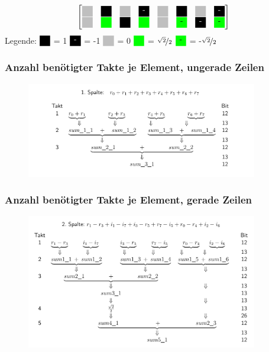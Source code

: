 \begin{frame}
\begin{center}
\begin{minipage}{0.9\textwidth}
\begin{center}
\[{\begin{bmatrix}
     \myboxZero 	& \myboxOnePos 		& \myboxZero 	& \myboxOneNeg 		& \myboxZero 	& \myboxOnePos 		& \myboxZero 	& \myboxOneNeg \\
     \myboxZero 	& \myboxSqrtPos 	& \myboxOnePos 	& \myboxSqrtPos		& \myboxZero	& \myboxSqrtNeg		& \myboxOneNeg	& \myboxSqrtNeg 
    \end{bmatrix}
   }
  \]
\vspace{0.5cm}
  Legende: $\myboxOnePos$ = 1 \quad $\myboxOneNeg$ = -1 \quad $\myboxZero$ = 0 \quad $\myboxSqrtPos$ = $\nicefrac{\sqrt{2}}{2}$ \quad $\myboxSqrtNeg$ = -$\nicefrac{\sqrt{2}}{2}$
\end{center}
\endgroup
\end{minipage}
\end{center}

\end{frame}




\begin{frame}\frametitle{Anzahl benötigter Takte je Element, ungerade Zeilen}
 \begin{figure}
  \centering
  \includegraphics[width=0.9\textwidth]{img/ungeradeZeilen.png}
 \end{figure}
\end{frame}


\begin{frame}\frametitle{Anzahl benötigter Takte je Element, gerade Zeilen}
\begin{figure}
 \centering
 \includegraphics[width=0.9\textwidth]{img/geradeZeilen.png}
\end{figure}
\end{frame}


